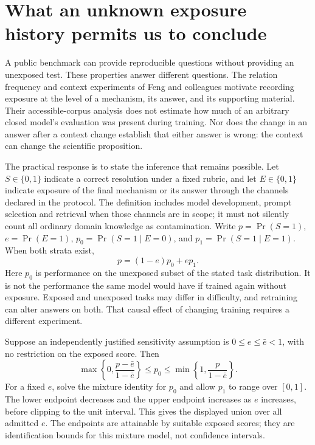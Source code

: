 \section{What an unknown exposure history permits us to conclude}
\label{exec14:l7-development}

A public benchmark can provide reproducible questions without providing an
unexposed test. These properties answer different questions. The relation
frequency and context experiments of Feng and colleagues motivate recording
exposure at the level of a mechanism, its answer, and its supporting material.
Their accessible-corpus analysis does not estimate how much of an arbitrary
closed model's evaluation was present during training. Nor does the change in
an answer after a context change establish that either answer is wrong: the
context can change the scientific proposition.
\citep{v12_la_2407_19638,exec14_l7_exposure_audit}

The practical response is to state the inference that remains possible. Let
\(S\in\{0,1\}\) indicate a correct resolution under a fixed rubric, and let
\(E\in\{0,1\}\) indicate exposure of the final mechanism or its answer through
the channels declared in the protocol. The definition includes model
development, prompt selection and retrieval when those channels are in scope;
it must not silently count all ordinary domain knowledge as contamination.
Write \(p=\Pr(S=1)\), \(e=\Pr(E=1)\),
\(p_0=\Pr(S=1\mid E=0)\), and \(p_1=\Pr(S=1\mid E=1)\).
When both strata exist,
\[
 p=(1-e)p_0+ep_1.
\]
Here \(p_0\) is performance on the unexposed subset of the stated task
distribution. It is not the performance the same model would have if trained
again without exposure. Exposed and unexposed tasks may differ in difficulty,
and retraining can alter answers on both. That causal effect of changing
training requires a different experiment.

Suppose an independently justified sensitivity assumption is
\(0\leq e\leq\bar e<1\), with no restriction on the exposed score. Then
\[
 \max\!\left\{0,\frac{p-\bar e}{1-\bar e}\right\}
 \leq p_0\leq
 \min\!\left\{1,\frac{p}{1-\bar e}\right\}.
\]
For a fixed \(e\), solve the mixture identity for \(p_0\) and allow
\(p_1\) to range over \([0,1]\). The lower endpoint decreases and the upper
endpoint increases as \(e\) increases, before clipping to the unit interval.
This gives the displayed union over all admitted \(e\). The endpoints are
attainable by suitable exposed scores; they are identification bounds for
this mixture model, not confidence intervals.

